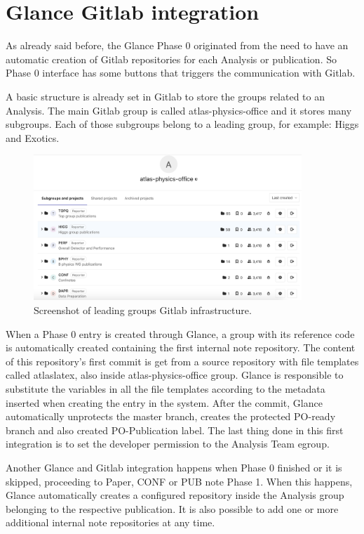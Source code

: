 \section{Glance Gitlab integration}
\label{sec:glance-gitlab-integration}

As already said before, the Glance Phase 0 originated from the need to have an automatic creation of Gitlab repositories for each Analysis or publication. So Phase 0 interface has some buttons that triggers the communication with Gitlab.

A basic structure is already set in Gitlab to store the groups related to an Analysis. The main Gitlab group is called atlas-physics-office and it stores many subgroups. Each of those subgroups belong to a leading group, for example: Higgs and Exotics.

\begin{figure}[ht!]
  \centering
  \includegraphics[width=0.9\textwidth]{po-lead-groups-tree.png}
  \caption{Screenshot of leading groups Gitlab infrastructure.}
  \label{fig:po-lead-groups-tree}
\end{figure}

When a Phase 0 entry is created through Glance, a group with its reference code is automatically created containing the first internal note repository. The content of this repository's first commit is get from a source repository with file templates called atlaslatex, also inside atlas-physics-office group. Glance is responsible to substitute the variables in all the file templates according to the metadata inserted when creating the entry in the system. After the commit, Glance automatically unprotects the master branch, creates the protected PO-ready branch and also created PO-Publication label. The last thing done in this first integration is to set the developer permission to the Analysis Team egroup.

Another Glance and Gitlab integration happens when Phase 0 finished or it is skipped, proceeding to Paper, CONF or PUB note Phase 1. When this happens, Glance automatically creates a configured repository inside the Analysis group belonging to the respective publication. It is also possible to add one or more additional internal note repositories at any time.

